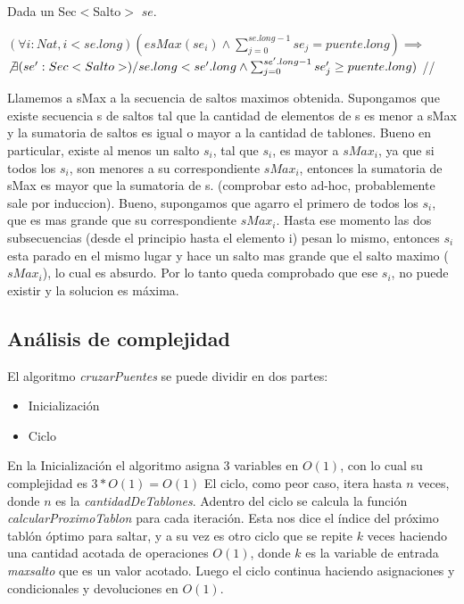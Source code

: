 Dada un Sec$<$Salto$>$ $se$.

$(\forall i:Nat, i < se.long)(esMax(se_{i}) \wedge \sum_{j=0}^{se.long-1}se_{j} = puente.long)\implies$ \\ $\not\exists (se':Sec<Salto>) /
se.long < se'.long \wedge \sum_{j=0}^{se'.long-1}se'_{j} \geq puente.long)$  //

Llamemos a sMax a la secuencia de saltos maximos obtenida.
Supongamos que existe secuencia s de saltos tal que la cantidad de elementos de s es menor a sMax y la sumatoria de saltos es igual o mayor a la cantidad de tablones.
Bueno en particular, existe al menos un salto $s_{i}$, tal que $s_{i}$, es mayor a $sMax_{i}$,  ya que si todos los $s_{i}$, son menores a su correspondiente $sMax_{i}$,
entonces la sumatoria de sMax es mayor que la sumatoria de s. (comprobar esto ad-hoc, probablemente sale por induccion).
Bueno, supongamos que agarro el primero de todos los $s_{i}$, que es mas grande que su correspondiente $sMax_{i}$.
Hasta ese momento las dos subsecuencias (desde el principio hasta el elemento i) pesan lo mismo, entonces $s_{i}$ esta parado en el mismo lugar y hace un salto mas grande que el salto maximo ($sMax_{i}$), lo cual es absurdo.
Por lo tanto queda comprobado que ese $s_{i}$, no puede existir y la solucion es m\'axima.

\subsection{An\'alisis de complejidad}
El algoritmo \textit{cruzarPuentes} se puede dividir en dos partes:
\begin{itemize}
\item Inicialización
\item Ciclo
\end{itemize}

En la Inicialización el algoritmo asigna 3 variables en $O(1)$, con lo cual su complejidad es $3*O(1) = O(1)$
El ciclo, como peor caso, itera hasta $n$ veces, donde $n$ es la \textit{cantidadDeTablones}. Adentro del ciclo se calcula la función \textit{calcularProximoTablon} para cada iteración. Esta nos dice el índice del próximo tablón óptimo para saltar, y a su vez es otro ciclo que se repite $k$ veces haciendo una cantidad acotada de operaciones $O(1)$, donde $k$ es la variable de entrada \textit{maxsalto} que es un valor acotado.
Luego el ciclo continua haciendo asignaciones y condicionales y devoluciones en $O(1)$.


